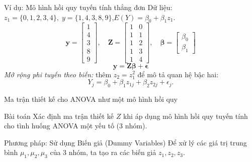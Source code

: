 \begin{frame}{Ví dụ: Mô hình hồi quy tuyến tính thẳng đơn}
Dữ liệu: $z_1=\{0,1,2,3,4\},\; y=\{1,4,3,8,9\}$,\quad $E(Y)=\beta_0+\beta_1 z_1$.
\[
\mathbf y=\begin{bmatrix}1\\4\\3\\8\\9\end{bmatrix},\quad
\mathbf Z=\begin{bmatrix}1&0\\1&1\\1&2\\1&3\\1&4\end{bmatrix},\quad
\boldsymbol{\beta}=\begin{bmatrix}\beta_0\\ \beta_1\end{bmatrix}
\]
\[
\mathbf y=\mathbf Z\boldsymbol{\beta}+\mathbf \epsilon
\]
\textit{Mở rộng phi tuyến theo biến:} thêm $z_2=z_1^2$ để mô tả quan hệ bậc hai:
\[
Y_j=\beta_0+\beta_1 z_{1j}+\beta_2 z_{2j}+\epsilon_j.
\]
\end{frame}

\begin{frame}{Ma trận thiết kế cho ANOVA như một mô hình hồi quy}

    
    \begin{exampleblock}{Bài toán}
        Xác định ma trận thiết kế $Z$ khi áp dụng mô hình hồi quy tuyến tính cho tình huống ANOVA một yếu tố (3 nhóm).
    \end{exampleblock}
    
    \pause
    
    \begin{block}{Phương pháp: Sử dụng Biến giả (Dummy Variables)}
        Để xử lý các giá trị trung bình $\mu_1, \mu_2, \mu_3$ của 3 nhóm, ta tạo ra các biến giả $z_1, z_2, z_3$.
    \end{block}
\end{frame}

